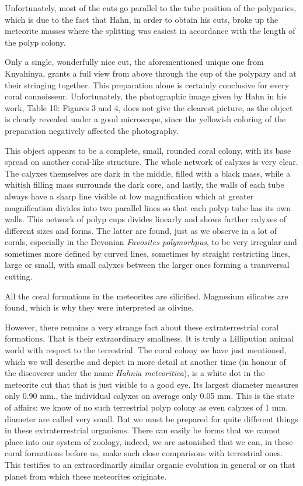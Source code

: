 \documentclass[a4paper, 12pt, oneside]{article}
\begin{document}
Unfortunately, most of the cuts go parallel to the tube position of the polyparies, which is due to the fact that Hahn, in order to obtain his cuts, broke up the meteorite masses where the splitting was easiest in accordance with the length of the polyp colony.

Only a single, wonderfully nice cut, the aforementioned unique one from Knyahinya, grants a full view from above through the cup of the polypary and at their stringing together. This preparation alone is certainly conclusive for every coral connoisseur. Unfortunately, the photographic image given by Hahn in his work, Table 10: Figures 3 and 4, does not give the clearest picture, as the object is clearly revealed under a good microscope, since the yellowish coloring of the preparation negatively affected the photography.

This object appears to be a complete, small, rounded coral colony, with its base spread on another coral-like structure. The whole network of calyxes is very clear. The calyxes themselves are dark in the middle, filled with a black mass, while a whitish filling mass surrounds the dark core, and lastly, the walls of each tube always have a sharp line visible at low magnification which at greater magnification divides into two parallel lines so that each polyp tube has its own walls. This network of polyp cups divides linearly and shows further calyxes of different sizes and forms. The latter are found, just as we observe in a lot of corals, especially in the Devonian \emph{Favosites polymorhpus}, to be very irregular and sometimes more defined by curved lines, sometimes by straight restricting lines, large or small, with small calyxes between the larger ones forming a transversal cutting.

All the coral formations in the meteorites are silicified. Magnesium silicates are found, which is why they were interpreted as olivine.

However, there remains a very strange fact about these extraterrestrial coral formations. That is their extraordinary smallness. It is truly a Lilliputian animal world with respect to the terrestrial. The coral colony we have just mentioned, which we will describe and depict in more detail at another time (in honour of the discoverer under the name \emph{Hahnia meteoritica}), is a white dot in the meteorite cut that that is just visible to a good eye. Its largest diameter measures only 0.90 mm., the individual calyxes on average only 0.05 mm. This is the state of affairs: we know of no such terrestrial polyp colony as even calyxes of 1 mm. diameter are called very small. But we must be prepared for quite different things in these extraterrestrial organisms. There can easily be forms that we cannot place into our system of zoology, indeed, we are astonished that we can, in these coral formations before us, make such close comparisons with terrestrial ones. This testifies to an extraordinarily similar organic evolution in general or on that planet from which these meteorites originate.
\end{document}
